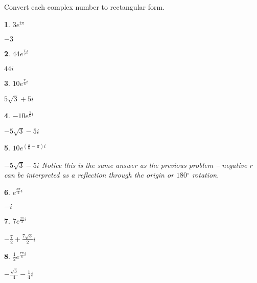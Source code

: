 \documentclass{amsbook}
\newtheorem{exc}{}
\newenvironment{ex}{\begin{exc}\normalfont}{\end{exc}}
\numberwithin{section}{chapter}
\numberwithin{equation}{chapter}
\newcommand{\ds}{\displaystyle}
\newcommand{\dg}{{^\circ}}
\begin{document}
Convert each complex number to rectangular form.

\begin{multicols}{2}
	
	\begin{ex}
		$3e^{i\pi}$
		\begin{sol}
			$-3$
		\end{sol}
	\end{ex}
	
	\begin{ex}
			$\ds 44e^{\frac{\pi}{2}i}$
		\begin{sol}
			$44i$
		\end{sol}
	\end{ex}
		
\begin{ex}
	$\ds 10e^{\frac{\pi}{6}i}$
	\begin{sol}
		$5\sqrt{3}+5i$
	\end{sol}
\end{ex}

		
\begin{ex}
	$\ds -10e^{\frac{\pi}{6}i}$
	\begin{sol}
		$-5\sqrt{3}-5i$
	\end{sol}
\end{ex}

		
\begin{ex}
	$\ds 10e^{\left(\frac{\pi}{6} - \pi \right)i}$
	\begin{sol}
		$-5\sqrt{3}-5i$ Notice this is the same answer as the previous problem -- negative $r$ can be interpreted as a reflection through the origin or $180\dg$ rotation.
	\end{sol}
\end{ex}

		
\begin{ex}
	$\ds e^{\frac{3\pi}{2}i}$
	\begin{sol}
		$-i$
	\end{sol}
\end{ex}
		
\begin{ex}
	$\ds 7e^{\frac{2\pi}{3}i}$
	\begin{sol}
		$-\frac{7}{2}+\frac{7\sqrt{3}}{2}i$
	\end{sol}
\end{ex}

		
\begin{ex}
	$ \frac{1}{2}e^{\frac{7\pi}{6}i}$
	\begin{sol}
		$-\frac{\sqrt{3}}{4}-\frac{1}{4}i$
	\end{sol}
\end{ex}
	
\end{multicols}
\end{document}
